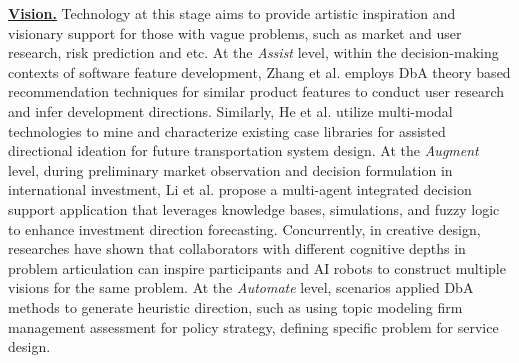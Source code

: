 \textbf{\underline{Vision.}} Technology at this stage aims to provide artistic inspiration and visionary support for those with vague problems, such as market and user research, risk prediction and etc. At the \textit{Assist} level, within the decision-making contexts of software feature development, Zhang et al. employs DbA theory based recommendation techniques for similar product features to conduct user research and infer development directions\cite{zhang2017systematic}. Similarly, He et al. utilize multi-modal technologies to mine and characterize existing case libraries for assisted directional ideation for future transportation system design\cite{he2019mining}. At the \textit{Augment} level, during preliminary market observation and decision formulation in international investment, Li et al. propose a multi-agent integrated decision support application that leverages knowledge bases, simulations, and fuzzy logic to enhance investment direction forecasting\cite{li2010agentsinternational}. Concurrently, in creative design, researches have shown that collaborators with different cognitive depths in problem articulation can inspire participants and AI robots to construct multiple visions for the same problem\cite{yu2014distributed, chan2014conceptual, christensen2016creative}. At the \textit{Automate }level, scenarios applied DbA methods to generate heuristic direction, such as using topic modeling firm management assessment for policy strategy\cite{gavetti2005strategy}, defining specific problem for service design\cite{moreno2014analogies}.


